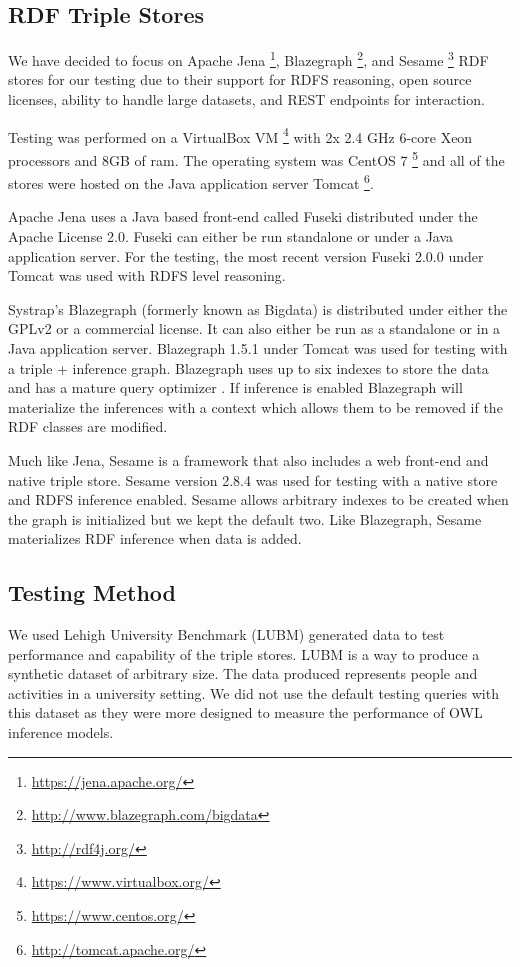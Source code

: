 \documentclass{llncs}
\begin{document}
\subsection{RDF Triple Stores}

We have decided to focus on Apache Jena \footnote{\url{https://jena.apache.org/}}, Blazegraph \footnote{\url{http://www.blazegraph.com/bigdata}}, and Sesame \footnote{\url{http://rdf4j.org/}}  RDF stores for our testing due to their support for RDFS reasoning, open source licenses, ability to handle large datasets, and REST endpoints for interaction. \cite{Voigt2012}

Testing was performed on a VirtualBox VM \footnote{\url{https://www.virtualbox.org/}} with 2x 2.4 GHz 6-core Xeon processors and 8GB of ram.  The operating system was CentOS 7 \footnote{\url{https://www.centos.org/}} and all of the stores were hosted on the Java application server Tomcat \footnote{\url{http://tomcat.apache.org/}}.

Apache Jena uses a Java based front-end called Fuseki distributed under the Apache License 2.0.  Fuseki can either be run standalone or under a Java application server.  For the testing, the most recent version Fuseki 2.0.0 under Tomcat was used with RDFS level reasoning.

Systrap's Blazegraph (formerly known as Bigdata) is distributed under either the GPLv2 or a commercial license.  It can also either be run as a standalone or in a Java application server.  Blazegraph 1.5.1 under Tomcat was used for testing with a triple + inference graph.  Blazegraph uses up to six indexes to store the data and has a mature query optimizer \cite{RDFDatabaseSystems}.  If inference is enabled Blazegraph will materialize the inferences with a context which allows them to be removed if the RDF classes are modified.

Much like Jena, Sesame is a framework that also includes a web front-end and native triple store.  Sesame version 2.8.4 was used for testing with a native store and RDFS inference enabled.  Sesame allows arbitrary indexes to be created when the graph is initialized but we kept the default two.  Like Blazegraph, Sesame materializes RDF inference when data is added.

\subsection{Testing Method}
We used Lehigh University Benchmark (LUBM) \cite{Guo2005} generated data to test performance and capability of the triple stores. LUBM is a way to produce a synthetic dataset of arbitrary size.  The data produced represents people and activities in a university setting.  We did not use the default testing queries with this dataset as they were more designed to measure the performance of OWL inference models.
\end{document}
